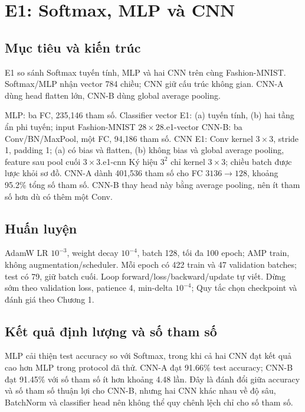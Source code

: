\chapter{E1: Softmax, MLP và CNN}
\section{Mục tiêu và kiến trúc}
E1 so sánh Softmax tuyến tính, MLP và hai CNN trên cùng Fashion-MNIST.
Softmax/MLP nhận vector 784 chiều; CNN giữ cấu trúc không gian. CNN-A dùng
head flatten lớn, CNN-B dùng global average pooling.

{\ArchMLP}{MLP: ba FC, 235,146 tham số.}
{Classifier vector E1: (a) tuyến tính, (b) hai tầng ẩn phi tuyến; input Fashion-MNIST $28\times28$.}{e1-vector}
{\ArchCNNB}{CNN-B: ba Conv/BN/MaxPool, một FC, 94,186 tham số.}
{CNN E1: Conv kernel $3\times3$, stride 1, padding 1; (a) có bias và flatten, (b) không bias và global average pooling, feature sau pool cuối $3\times3$.}{e1-cnn}
Ký hiệu $3^2$ chỉ kernel $3\times3$; chiều batch được lược khỏi sơ đồ. CNN-A dành 401,536 tham số cho
FC $3136\to 128$, khoảng 95.2\% tổng số tham số. CNN-B thay head này bằng
average pooling, nên ít tham số hơn dù có thêm một Conv.

\section{Huấn luyện}
AdamW LR $10^{-3}$, weight decay $10^{-4}$, batch 128, tối đa 100 epoch;
AMP train, không augmentation/scheduler. Mỗi epoch có 422 train và 47 validation
batches; test có 79, giữ batch cuối. Loop forward/loss/backward/update tự viết.
Dừng sớm theo validation loss, patience 4, min-delta $10^{-4}$;
Quy tắc chọn checkpoint và đánh giá theo Chương 1.

\section{Kết quả định lượng và số tham số}
MLP cải thiện test accuracy so với Softmax, trong khi cả hai CNN đạt
kết quả cao hơn MLP trong protocol đã thử. CNN-A đạt 91.66\% test accuracy;
CNN-B đạt 91.45\% với số tham số ít hơn khoảng 4.48 lần. Đây là đánh đổi
giữa accuracy và số tham số thuận lợi cho CNN-B, nhưng hai CNN khác nhau về độ sâu,
BatchNorm và classifier head nên không thể quy chênh lệch chỉ cho số tham số.

